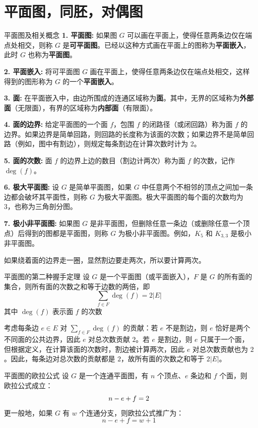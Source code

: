 \section{平面图，同胚，对偶图}
\begin{definition}{平面图及相关概念}{}
\textbf{1. 平面图:}
如果图 $G$ 可以画在平面上，使得任意两条边仅在端点处相交，则称 $G$ 是\textbf{可平面图}。已经以这种方式画在平面上的图称为\textbf{平面嵌入}，此时 $G$ 也称为\textbf{平面图}。

\textbf{2. 平面嵌入:}
将可平面图 $G$ 画在平面上，使得任意两条边仅在端点处相交，这样得到的图形称为 $G$ 的一个\textbf{平面嵌入}。

\textbf{3. 面:}
在平面嵌入中，由边所围成的连通区域称为\textbf{面}。其中，无界的区域称为\textbf{外部面}（无限面），有界的区域称为\textbf{内部面}（有限面）。

\textbf{4. 面的边界:}
给定平面图的一个面 $f$，包围 $f$ 的闭路径（或闭回路）称为面 $f$ 的边界。如果边界是简单回路，则回路的长度称为该面的次数；如果边界不是简单回路（例如，图中有割边），则规定每条割边在计算次数时计为 2。

\textbf{5. 面的次数:}
面 $f$ 的边界上边的数目（割边计两次）称为面 $f$ 的次数，记作 $\deg(f)$。

\textbf{6. 极大平面图:}
设 $G$ 是简单平面图，如果 $G$ 中任意两个不相邻的顶点之间加一条边都会破坏其平面性，则称 $G$ 为极大平面图。极大平面图的每个面的次数均为 3，也称为三角剖分图。

\textbf{7. 极小非平面图:}
如果图 $G$ 是非平面图，但删除任意一条边（或删除任意一个顶点）后得到的图都是平面图，则称 $G$ 为极小非平面图。例如，$K_5$ 和 $K_{3,3}$ 是极小非平面图。
\end{definition}
如果绕着面的边界走一圈，显然割边要走两次，所以要计算两次。
\begin{theorem}{平面图的第二种握手定理}{}
设 $G$ 是一个平面图（或平面嵌入），$F$ 是 $G$ 的所有面的集合，则所有面的次数之和等于边数的两倍，即
\[
\sum_{f \in F} \deg(f) = 2|E|
\]
其中 $\deg(f)$ 表示面 $f$ 的次数
\end{theorem}
考虑每条边 $e \in E$ 对 $\sum_{f \in F} \deg(f)$ 的贡献：若 $e$ 不是割边，则 $e$ 恰好是两个不同面的公共边界，因此 $e$ 对总次数贡献 $2$。若 $e$ 是割边，则 $e$ 只属于一个面，但根据定义，在计算该面的次数时，割边被计算两次，因此 $e$ 对总次数贡献也为 $2$。因此，每条边对总次数的贡献都是 $2$，故所有面的次数之和等于 $2|E|$。
\begin{theorem}{平面图的欧拉公式}{}
设 $G$ 是一个连通平面图，有 $n$ 个顶点、$e$ 条边和 $f$ 个面，则欧拉公式成立：\vspace{-10pt}
\[
n - e + f = 2\vspace{-10pt}
\]
更一般地，如果 $G$ 有 $w$ 个连通分支，则欧拉公式推广为：\vspace{-10pt}
\[
n - e + f = w + 1
\]
\end{theorem}
